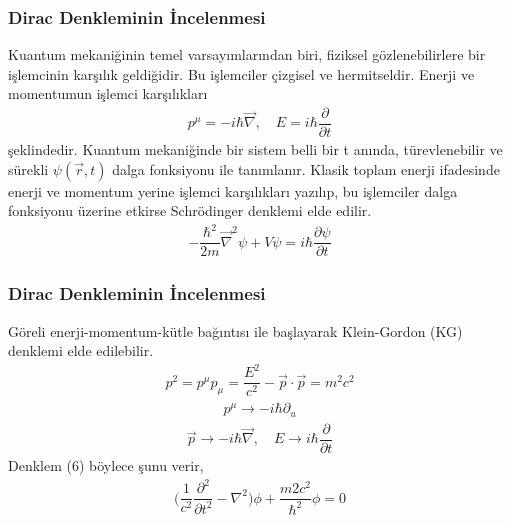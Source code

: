 \documentclass[aspectratio=169,10pt]{beamer}
\begin{document}
	\begin{frame}[allowframebreaks]
\frametitle{Dirac Denkleminin İncelenmesi}

Kuantum mekaniğinin temel varsayımlarından biri, fiziksel gözlenebilirlere bir işlemcinin karşılık geldiğidir. Bu işlemciler çizgisel ve hermitseldir. Enerji ve momentumun işlemci karşılıkları
\begin{align}
    p^{\mu} = -i \hbar \Vec{\nabla}, \quad E=i \hbar \dfrac{\partial}{\partial t}
\end{align}
şeklindedir. Kuantum mekaniğinde bir sistem belli bir t anında, türevlenebilir ve sürekli $ \psi (\Vec{r},t) $ dalga fonksiyonu ile tanımlanır. Klasik toplam enerji ifadesinde enerji
ve momentum yerine işlemci karşılıkları yazılıp, bu işlemciler dalga fonksiyonu üzerine etkirse
Schrödinger denklemi elde edilir.
\begin{align}
    - \dfrac{\hbar^{2}}{2m} \Vec{\nabla}^{2} \psi + V \psi = i \hbar \dfrac{\partial \psi}{\partial t}
\end{align}
\end{frame}

	\begin{frame}[allowframebreaks]
\frametitle{Dirac Denkleminin İncelenmesi}

Göreli enerji-momentum-kütle bağıntısı ile başlayarak Klein-Gordon (KG) denklemi elde edilebilir.
\begin{align}
    p^{2} = p^{\mu}p_{\mu} = \dfrac{E^{2}}{c^{2}} - \Vec{p} \cdot \Vec{p} = m^{2} c^{2}
\end{align}
\begin{align}
    p^{\mu} \rightarrow -i \hbar \partial_{u}
\end{align}
\begin{align}
\Vec{p} \rightarrow -i \hbar \Vec{\nabla}, \quad E \rightarrow i \hbar \dfrac{\partial}{\partial t}
\end{align}
Denklem (6) böylece şunu verir,
\begin{align}
    \bigg( \dfrac{1}{c^{2}}\dfrac{\partial^{2}}{\partial t ^{2}} - \nabla^{2} \bigg) \phi + \dfrac{m{2}c^{2}}{\hbar^{2}} \phi = 0
\end{align}



\end{frame}
\end{document}
